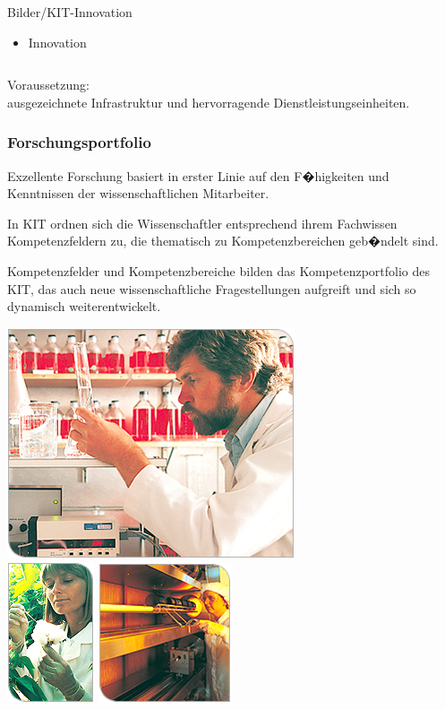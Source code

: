 \documentclass[t]{beamer}
\newlength{\tmplen}
\begin{document}
\begin{frame}
\begin{columns}[onlytextwidth]
\begin{column}{\tmplen}
        {Bilder/KIT-Innovation}
      \begin{itemize}\item Innovation\end{itemize}
    \end{column}
  \end{columns}
  \bigskip

  \small
  Voraussetzung:\\
  ausgezeichnete Infrastruktur und hervorragende Dienstleistungseinheiten.
\end{frame}

\begin{frame}
  \frametitle{Forschungsportfolio}

  \parbox{.64\textwidth}{\raggedright
    Exzellente Forschung basiert in erster Linie auf den F�higkeiten und
    Kenntnissen der wissenschaftlichen Mitarbeiter.
    \bigskip

    In KIT ordnen sich die Wissenschaftler entsprechend ihrem Fachwissen
    Kompetenzfeldern zu, die thematisch zu Kompetenzbereichen geb�ndelt sind.
    \bigskip

    Kompetenzfelder und Kompetenzbereiche bilden das Kompetenzportfolio
    des KIT, das auch neue wissenschaftliche Fragestellungen aufgreift
    und sich so dynamisch weiterentwickelt.}
  \hfill
  \parbox{.312\textwidth}{%
    \includegraphics[width=.312\textwidth]
      {Bilder/KIT-Labor1}\\
    \includegraphics[width=.133\textwidth]
      {Bilder/KIT-Labor2}
    \hfill
    \includegraphics[width=.176\textwidth]
      {Bilder/KIT-Labor3}}
\end{frame}
\end{document}
